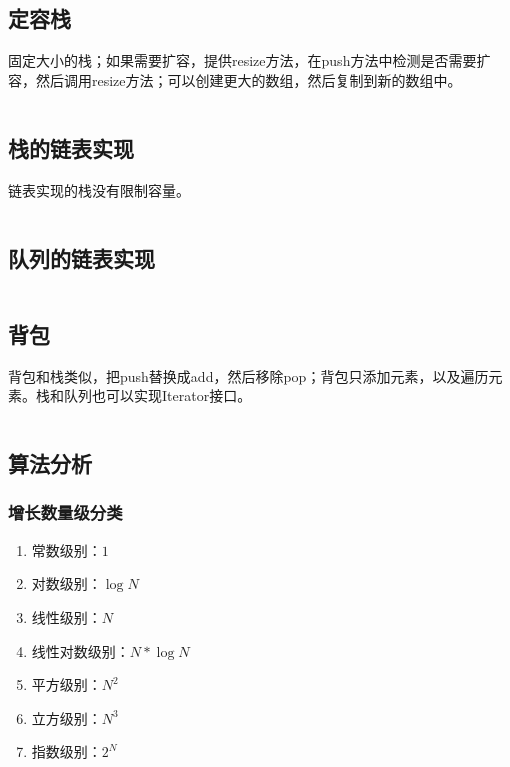 \documentclass{article}
\begin{document}
  \inputminted{java}{src/chapter01/ArithmeticExpression.java}

  \subsection{定容栈}
  固定大小的栈；如果需要扩容，提供resize方法，在push方法中检测是否需要扩容，然后调用resize方法；可以创建更大的数组，然后复制到新的数组中。

  \inputminted{java}{src/chapter01/FixedCapacityStack.java}

  \subsection{栈的链表实现}
  链表实现的栈没有限制容量。

  \inputminted{java}{src/chapter01/LinkedStack.java}

  \subsection{队列的链表实现}

  \inputminted{java}{src/chapter01/LinkedQueue.java}

  \subsection{背包}
  背包和栈类似，把push替换成add，然后移除pop；背包只添加元素，以及遍历元素。栈和队列也可以实现Iterator接口。

  \inputminted{java}{src/chapter01/Bag.java}

  \subsection{算法分析}
  \subsubsection{增长数量级分类}

  \begin{enumerate}
    \item 常数级别：$1$
    \item 对数级别：$\log N$
    \item 线性级别：$N$
    \item 线性对数级别：$N * \log N$
    \item 平方级别：$N^2$
    \item 立方级别：$N^3$
    \item 指数级别：$2^N$
  \end{enumerate}
\end{document}
